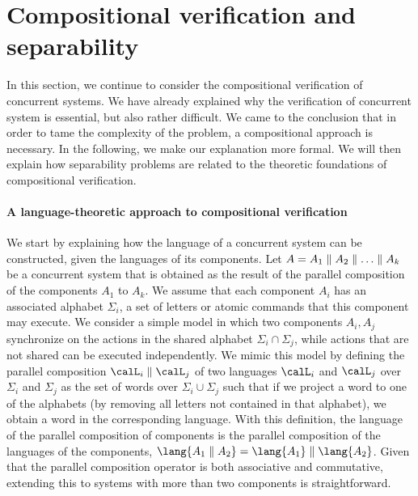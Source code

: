 \documentclass[../../diss.tex]{subfiles}
\begin{document}
\section{Compositional verification and separability}%
\label{Section:IntroSeparability}%

In this section, we continue to consider the compositional verification of concurrent systems.
We have already explained why the verification of concurrent system is essential, but also rather difficult.
We came to the conclusion that in order to tame the complexity of the problem, a compositional approach is necessary.
In the following, we make our explanation more formal.
We will then explain how separability problems are related to the theoretic foundations of compositional verification.

\paragraph{A language-theoretic approach to compositional verification}

We start by explaining how the language of a concurrent system can be constructed, given the languages of its components.
Let $A = A_1 \mathrel{\|} A_2 \mathrel{\|} \ldots \mathrel{\|} A_k$ be a concurrent system that is obtained as the result of the parallel composition of the components $A_1$ to $A_k$.
We assume that each component $A_i$ has an associated alphabet $\Sigma_i$, a set of letters or atomic commands that this component may execute.
We consider a simple model in which two components $A_i, A_j$ synchronize on the actions in the shared alphabet $\Sigma_i \cap \Sigma_j$, while actions that are not shared can be executed independently.
We mimic this model by defining the parallel composition $\calL_i \parcomp \calL_j$ of two languages $\calL_i$ and $\calL_j$ over $\Sigma_i$ and $\Sigma_j$ as the set of words over $\Sigma_i \cup \Sigma_j$ such that if we project a word to one of the alphabets (by removing all letters not contained in that alphabet), we obtain a word in the corresponding language.
With this definition, the language of the parallel composition of components is the parallel composition of the languages of the components, $\lang{A_1 \parcomp A_2} = \lang{A_1} \parcomp \lang{A_2}$.
Given that the parallel composition operator is both associative and commutative, extending this to systems with more than two components is straightforward.
\end{document}
